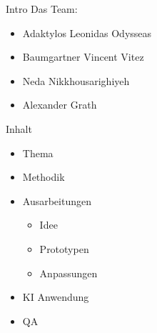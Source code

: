   \begin{frame}{Intro}
    \alert{Das Team:}
    \begin{itemize}
      \item Adaktylos Leonidas Odysseas
      \item Baumgartner Vincent Vitez
      \item Neda Nikkhousarighiyeh
      \item Alexander Grath
    \end{itemize}
  \end{frame}
  \begin{frame}{Inhalt}
    \begin{itemize}
      \item Thema
      \item Methodik
      \item Ausarbeitungen
      \begin{itemize}
        \item Idee
        \item Prototypen
        \item Anpassungen
      \end{itemize}
      \item KI Anwendung
      \item QA
    \end{itemize}
  \end{frame}
